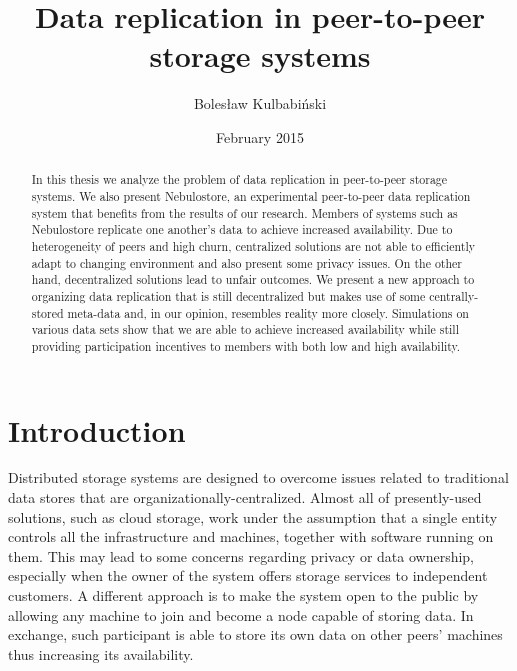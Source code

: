 \documentclass{pracamgren}
\author{Bolesław Kulbabiński}
\title{Data replication in peer-to-peer storage systems}
\date{February 2015}
\begin{document}
 \maketitle

\begin{abstract} 
In this thesis we analyze the problem of data replication in peer-to-peer storage systems.
We also present Nebulostore, an experimental peer-to-peer data replication system that benefits from the results of our research.
Members of systems such as Nebulostore replicate one another's data to achieve increased availability. Due to heterogeneity of peers and high churn, centralized solutions are not able to efficiently adapt to changing environment and also present some privacy issues. On the other hand, decentralized solutions lead to unfair outcomes. We present a new approach to organizing data replication that is still decentralized but makes use of some centrally-stored meta-data and, in our opinion, resembles reality more closely. Simulations on various data sets show that we are able to achieve increased availability while still providing participation incentives to members with both low and high availability.
\end{abstract}


\tableofcontents


\chapter*{Introduction}\label{chap::introduction}

Distributed storage systems are designed to overcome issues related to traditional data stores that are organizationally-centralized.
Almost all of presently-used solutions, such as cloud storage, work under the assumption that a single entity controls all the infrastructure and machines, together with software running on them. This may lead to some concerns regarding privacy or data ownership, especially when the owner of the system offers storage services to independent customers.
A different approach is to make the system open to the public by allowing any machine to join and become a node capable of storing data. In exchange, such participant is able to store its own data on other peers' machines thus increasing its availability.\\
\end{document}
